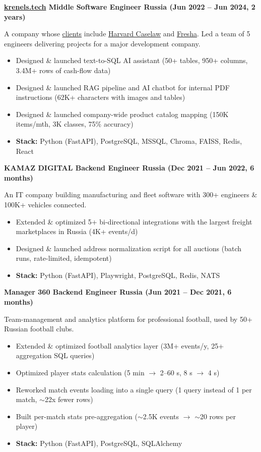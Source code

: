 \documentclass[10pt,letterpaper]{article}
\newcommand{\job}[4]{%
  \par{\small\bfseries #1 \textbar{} #2 \textbar{} #3 (#4)}\par\vspace{3pt}}
\newcommand{\about}[1]{{\small #1}\par}
\newcommand{\stack}[1]{\item \textbf{Stack:} #1}
\begin{document}
\job{\href{https://krenels.tech}{krenels.tech}}{Middle Software Engineer}{Russia}{Jun 2022 -- Jun 2024, 2 years}
\about{A company whose \href{https://krenels.tech/\#:~:text=Companies\%20we\%20built\%20for}{clients} include \href{https://case.law/}{Harvard Caselaw} and \href{https://www.fresha.com/}{Fresha}. Led a team of 5 engineers delivering projects for a major development company.}
\begin{itemize}
  \item Designed \& launched text-to-SQL AI assistant (50+ tables, 950+ columns, 3.4M+ rows of cash-flow data)
  \item Designed \& launched RAG pipeline and AI chatbot for internal PDF instructions (62K+ characters with images and tables)
  \item Designed \& launched company-wide product catalog mapping (150K items/mth, 3K classes, 75\% accuracy)
  \stack{Python (FastAPI), PostgreSQL, MSSQL, Chroma, FAISS, Redis, React}
\end{itemize}
\vspace{6pt}

\job{KAMAZ DIGITAL}{Backend Engineer}{Russia}{Dec 2021 -- Jun 2022, 6 months}
\about{An IT company building manufacturing and fleet software with 300+ engineers \& 100K+ vehicles connected.}
\begin{itemize}
  \item Extended \& optimized 5+ bi-directional integrations with the largest freight marketplaces in Russia (4K+ events/d)
  \item Designed \& launched address normalization script for all auctions (batch runs, rate-limited, idempotent)
  \stack{Python (FastAPI), Playwright, PostgreSQL, Redis, NATS}
\end{itemize}
\vspace{6pt}

\job{Manager 360}{Backend Engineer}{Russia}{Jun 2021 -- Dec 2021, 6 months}
\about{Team-management and analytics platform for professional football, used by 50+ Russian football clubs.}
\begin{itemize}
  \item Extended \& optimized football analytics layer (3M+ events/y, 25+ aggregation SQL queries)
  \item Optimized player stats calculation (5 min $\rightarrow$ 2--60 s, 8 s $\rightarrow$ 4 s)
  \item Reworked match events loading into a single query (1 query instead of 1 per match, $\sim$22x fewer rows)
  \item Built per-match stats pre-aggregation ($\sim$2.5K events $\rightarrow$ $\sim$20 rows per player)
  \stack{Python (FastAPI), PostgreSQL, SQLAlchemy}
\end{itemize}
\end{document}
